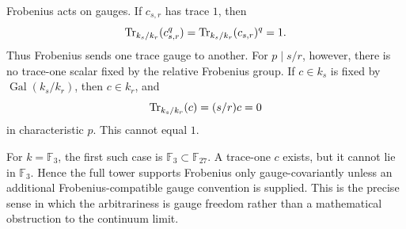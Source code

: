Frobenius acts on gauges.  If \(c_{s,r}\) has trace \(1\), then
\[
  \operatorname{Tr}_{k_s/k_r}(c_{s,r}^q)=\operatorname{Tr}_{k_s/k_r}(c_{s,r})^q=1.
\]
Thus Frobenius sends one trace gauge to another.  For \(p\mid s/r\), however,
there is no trace-one scalar fixed by the relative Frobenius group.  If
\(c\in k_s\) is fixed by \(\operatorname{Gal}(k_s/k_r)\), then \(c\in k_r\),
and
\[
  \operatorname{Tr}_{k_s/k_r}(c)=(s/r)c=0
\]
in characteristic \(p\).  This cannot equal \(1\).

For \(k=\mathbb F_3\), the first such case is
\(\mathbb F_3\subset\mathbb F_{27}\).  A trace-one \(c\) exists, but it cannot
lie in \(\mathbb F_3\).  Hence the full tower supports Frobenius only
gauge-covariantly unless an additional Frobenius-compatible gauge convention
is supplied.  This is the precise sense in which the arbitrariness is gauge
freedom rather than a mathematical obstruction to the continuum limit.
